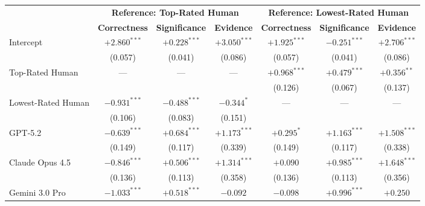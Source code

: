 \begin{table}[t]
\centering
\fontsize{7.5}{10}\selectfont
\setlength{\tabcolsep}{4pt}
\begin{tabular}{l ccc ccc}
\toprule
& \multicolumn{3}{c}{\textbf{Reference: Top-Rated Human}} & \multicolumn{3}{c}{\textbf{Reference: Lowest-Rated Human}} \\
\cmidrule(lr){2-4} \cmidrule(lr){5-7}
& \textbf{Correctness} & \textbf{Significance} & \textbf{Evidence} & \textbf{Correctness} & \textbf{Significance} & \textbf{Evidence} \\
\midrule
Intercept            & $+2.860^{***}$ & $+0.228^{***}$ & $+3.050^{***}$ & $+1.925^{***}$ & $-0.251^{***}$ & $+2.706^{***}$ \\
                     & {\scriptsize (0.057)} & {\scriptsize (0.041)} & {\scriptsize (0.086)} & {\scriptsize (0.057)} & {\scriptsize (0.041)} & {\scriptsize (0.086)} \\[3pt]
Top-Rated Human      & ---            & ---            & ---            & $+0.968^{***}$ & $+0.479^{***}$ & $+0.356^{**}$  \\
                     &                &                &                & {\scriptsize (0.126)} & {\scriptsize (0.067)} & {\scriptsize (0.137)} \\[3pt]
Lowest-Rated Human   & $-0.931^{***}$ & $-0.488^{***}$ & $-0.344^{*}$   & ---            & ---            & ---            \\
                     & {\scriptsize (0.106)} & {\scriptsize (0.083)} & {\scriptsize (0.151)} &                &                &                \\[3pt]
GPT-5.2              & $-0.639^{***}$ & $+0.684^{***}$ & $+1.173^{***}$ & $+0.295^{*}$   & $+1.163^{***}$ & $+1.508^{***}$ \\
                     & {\scriptsize (0.149)} & {\scriptsize (0.117)} & {\scriptsize (0.339)} & {\scriptsize (0.149)} & {\scriptsize (0.117)} & {\scriptsize (0.338)} \\[3pt]
Claude Opus 4.5      & $-0.846^{***}$ & $+0.506^{***}$ & $+1.314^{***}$ & $+0.090$       & $+0.985^{***}$ & $+1.648^{***}$ \\
                     & {\scriptsize (0.136)} & {\scriptsize (0.113)} & {\scriptsize (0.358)} & {\scriptsize (0.136)} & {\scriptsize (0.113)} & {\scriptsize (0.356)} \\[3pt]
Gemini 3.0 Pro       & $-1.033^{***}$ & $+0.518^{***}$ & $-0.092$       & $-0.098$       & $+0.996^{***}$ & $+0.250$       \\

\end{tabular}
\end{table}
